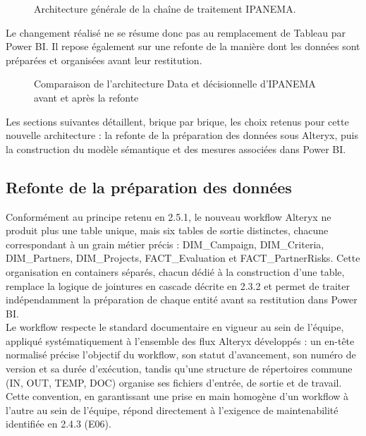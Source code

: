 \begin{figure}[H]
    \centering
    \caption{Architecture générale de la chaîne de traitement IPANEMA.}
    \label{Architecture_générale_de_la_chaîne_de_traitement_IPANEMA}
\end{figure}

Le changement réalisé ne se résume donc pas au remplacement de Tableau par Power 
BI. Il repose également sur une refonte de la manière dont les données sont préparées et 
organisées avant leur restitution. 

\begin{figure}[H]
    \centering
    \caption{Comparaison de l'architecture Data et décisionnelle d'IPANEMA avant et après la refonte}
    \label{Comparaison_de_l'architecture_Data_et_décisionnelle_avant_apres}
\end{figure}

Les sections suivantes détaillent, brique par brique, les choix retenus pour cette nouvelle 
architecture : la refonte de la préparation des données sous Alteryx, puis la construction du 
modèle sémantique et des mesures associées dans Power BI.

\subsection{Refonte de la préparation des données}
Conformément au principe retenu en 2.5.1, le nouveau workflow Alteryx ne produit plus 
une table unique, mais six tables de sortie distinctes, chacune correspondant à un grain métier 
précis : DIM\_Campaign, DIM\_Criteria, DIM\_Partners, DIM\_Projects, FACT\_Evaluation et 
FACT\_PartnerRisks. Cette organisation en containers séparés, chacun dédié à la construction 
d'une table, remplace la logique de jointures en cascade décrite en 2.3.2 et permet de traiter 
indépendamment la préparation de chaque entité avant sa restitution dans Power BI. \\

Le workflow respecte le standard documentaire en vigueur au sein de l'équipe, appliqué 
systématiquement à l'ensemble des flux Alteryx développés : un en-tête normalisé précise 
l'objectif du workflow, son statut d'avancement, son numéro de version et sa durée d'exécution, 
tandis qu'une structure de répertoires commune (IN, OUT, TEMP, DOC) organise ses fichiers d'entrée, de sortie et de travail. Cette convention, en garantissant une prise en main homogène 
d'un workflow à l'autre au sein de l'équipe, répond directement à l'exigence de maintenabilité 
identifiée en 2.4.3 (E06).

